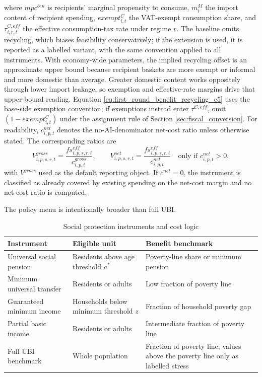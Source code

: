 \documentclass[11pt,a4paper]{article}
\begin{document}
where $mpc^{ben}$ is recipients' marginal propensity to consume, $m^M_i$ the import content of recipient spending, $exempt^C_{i,t}$ the VAT-exempt consumption share, and $\tau^{C,eff}_{i,r,t}$ the effective consumption-tax rate under regime $r$. The baseline omits recycling, which biases feasibility conservatively; if the extension is used, it is reported as a labelled variant, with the same convention applied to all instruments. With economy-wide parameters, the implied recycling offset is an approximate upper bound because recipient baskets are more exempt or informal and more domestic than average. Greater domestic content works oppositely through lower import leakage, so exemption and effective-rate margins drive that upper-bound reading. Equation \eqref{eq:first_round_benefit_recycling_e5} uses the base-side exemption convention; if exemptions instead enter $\tau^{C,eff}$, omit $(1-exempt^C_{i,t})$ under the assignment rule of Section \ref{sec:fiscal_conversion}.
For readability, $c^{net}_{i,p,t}$ denotes the no-AI-denominator net-cost ratio unless otherwise stated. The corresponding ratios are
\begin{equation}
    V^{gross}_{i,p,s,r,t}=\frac{fs^{eff}_{i,p,s,r,t}}{c^{gross}_{i,p,t}},
    \qquad
    V^{net}_{i,p,s,r,t}=\frac{fs^{eff}_{i,p,s,r,t}}{c^{net}_{i,p,t}}\quad\text{only if }c^{net}_{i,p,t}>0,
\end{equation}
with $V^{gross}$ used as the default reporting object. If $c^{net}=0$, the instrument is classified as already covered by existing spending on the net-cost margin and no net-cost ratio is computed.

The policy menu is intentionally broader than full UBI.

\begin{table}[H]
\centering
\caption{Social protection instruments and cost logic}
\label{tab:policy_rules}
\small
\begin{tabular}{p{}p{}p{}}
\toprule
Instrument & Eligible unit & Benefit benchmark \\
\midrule
Universal social pension & Residents above age threshold $a^*$ & Poverty-line share or minimum pension \\
Minimum universal transfer & Residents or adults & Low fraction of poverty line \\
Guaranteed minimum income & Households below minimum threshold $z$ & Fraction of household poverty gap \\
Partial basic income & Residents or adults & Intermediate fraction of poverty line \\
Full UBI benchmark & Whole population & Fraction of poverty line; values above the poverty line only as labelled stress \\
\bottomrule
\end{tabular}
\end{table}
\end{document}
